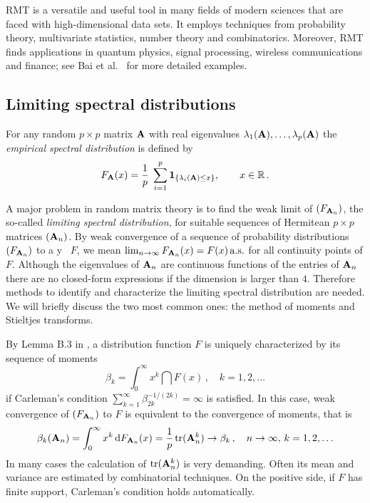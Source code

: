 RMT is a versatile and useful tool in many fields of modern sciences that are faced with high-dimensional data sets. It  employs techniques from probability theory, multivariate statistics, number theory and combinatorics. Moreover, RMT finds applications in quantum physics, signal processing, wireless communications and finance; see Bai et al.~\cite{bai:fang:liang:2014} for more detailed examples. 


\subsection{Limiting spectral distributions}

For any random $p\times p$ matrix ${\mathbf A}$ with real eigenvalues $\lambda_1({\mathbf A}),\ldots,\lambda_p({\mathbf A})$ the {\em empirical spectral distribution} is defined by 
\begin{equation*}
F_{{\mathbf A}}(x)= \frac{1}{p}\; \sum_{i=1}^p \mathbf{1}_{\{ \lambda_i({\mathbf A})\le x \}}, \qquad x\in  \mathbb{R}\,.
\end{equation*}

A major problem in random matrix theory is to find the weak limit of $(F_{{\mathbf A}_n})$, the so-called {\em limiting spectral distribution}, for suitable sequences of Hermitean $p\times p$ matrices $({\mathbf A}_n)$. By weak convergence of a sequence of probability distributions $(F_{{\mathbf A}_n})$ 
to a \pro y \ds\ $F$, we mean $\lim_{n \to \infty} F_{{\mathbf A}_n}(x)=F(x) \,{\rm a.s.}$ for all continuity points of $F$.
Although the eigenvalues of ${\mathbf A}_n$ are continuous functions of the entries of ${\mathbf A}_n$ there are no closed-form expressions if the dimension is larger than $4$. Therefore methods to identify and characterize the limiting spectral distribution are needed. We will briefly discuss the two most common ones: the method of moments and Stieltjes transforms.
\par

By Lemma B.3 in \cite{bai:silverstein:2010}, a distribution function $F$ is uniquely characterized by its sequence of moments 
\begin{equation*}
\beta_k=\int_0^{\infty} x^k \dint F (x)\,, \quad k=1,2,\ldots
\end{equation*}
if Carleman's condition $\sum_{k=1}^{\infty} \beta_{2k}^{-1/(2k)}=\infty$ is satisfied. In this case, weak convergence of $(F_{{\mathbf A}_n})$ to $F$ is equivalent to the convergence of moments, that is
\begin{equation}\label{eq:mmom}
\beta_k({\mathbf A}_n)= \int_0^{\infty} x^k \,\mathrm{d} F_{{\mathbf A}_n} (x)=\frac{1}{p} \operatorname{tr}({\mathbf A}_n^k) \to \beta_k\,,\quad n \to \infty, \,k=1,2,\ldots
\end{equation}
In many cases the calculation of $\operatorname{tr}({\mathbf A}_n^k)$ is very demanding. Often its mean and variance are estimated by combinatorial techniques.
On the positive side, if $F$ has finite support, Carleman's condition holds automatically.
\par

